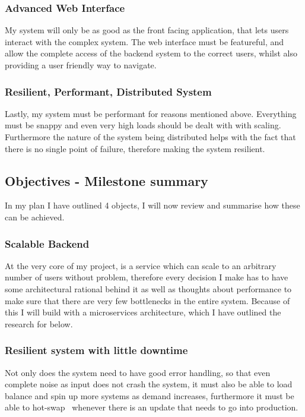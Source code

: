 \documentclass[titlepage]{article}
\begin{document}
\subsubsection{Advanced Web Interface}
My system will only be as good as the front facing application, that lets users interact with the complex system. The web interface must be featureful, and allow the complete access of the backend system to the correct users, whilst also providing a user friendly way to navigate.

\subsubsection{Resilient, Performant, Distributed System}
Lastly, my system must be performant for reasons mentioned above. Everything must be snappy and even very high loads should be dealt with with scaling. Furthermore the nature of the system being distributed helps with the fact that there is no single point of failure, therefore making the system resilient.

\subsection{Objectives - Milestone summary}

In my plan I have outlined 4 objects, I will now review and summarise how these can be achieved.

\subsubsection{Scalable Backend}
At the very core of my project, is a service which can scale to an arbitrary number of users without problem, therefore every decision I make has to have some architectural rational behind it as well as thoughts about performance to make sure that there are very few bottlenecks in the entire system. Because of this I will build with a microservices architecture, which I have outlined the research for below.

\subsubsection{Resilient system with little downtime}
Not only does the system need to have good error handling, so that even complete noise as input does not crash the system, it must also be able to load balance and spin up more systems as demand increases, furthermore it must be able to hot-swap~\cite{hot_swap} whenever there is an update that needs to go into production. 
\end{document}
